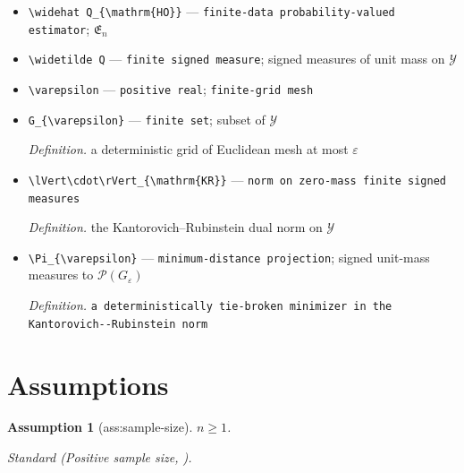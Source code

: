 \documentclass{article}
\newtheorem{assumption}{Assumption}
\begin{document}
\begin{itemize}
  \par\smallskip\noindent\emph{Definition.} \texttt{the optimized shared-\allowbreak{}sign interaction lower envelope}
  \item \texttt{\textbackslash{}\allowbreak{}widehat Q\_\allowbreak{}\{\textbackslash{}\allowbreak{}mathrm\{HO\}\allowbreak{}\}\allowbreak{}} --- \texttt{finite-\allowbreak{}data probability-\allowbreak{}valued estimator}; \(\mathfrak E_n\)
  \item \texttt{\textbackslash{}\allowbreak{}widetilde Q} --- \texttt{finite signed measure}; signed measures of unit mass on \(\mathcal Y\)
  \item \texttt{\textbackslash{}\allowbreak{}varepsilon} --- \texttt{positive real}; \texttt{finite-\allowbreak{}grid mesh}
  \item \texttt{G\_\allowbreak{}\{\textbackslash{}\allowbreak{}varepsilon\}\allowbreak{}} --- \texttt{finite set}; subset of \(\mathcal Y\)
  \par\smallskip\noindent\emph{Definition.} a deterministic grid of Euclidean mesh at most \(\varepsilon\)
  \item \texttt{\textbackslash{}\allowbreak{}lVert\textbackslash{}\allowbreak{}cdot\textbackslash{}\allowbreak{}rVert\_\allowbreak{}\{\textbackslash{}\allowbreak{}mathrm\{KR\}\allowbreak{}\}\allowbreak{}} --- \texttt{norm on zero-\allowbreak{}mass finite signed measures}
  \par\smallskip\noindent\emph{Definition.} the Kantorovich--Rubinstein dual norm on \(\mathcal Y\)
  \item \texttt{\textbackslash{}\allowbreak{}Pi\_\allowbreak{}\{\textbackslash{}\allowbreak{}varepsilon\}\allowbreak{}} --- \texttt{minimum-\allowbreak{}distance projection}; signed unit-mass measures to \(\mathcal P(G_{\varepsilon})\)
  \par\smallskip\noindent\emph{Definition.} \texttt{a deterministically tie-\allowbreak{}broken minimizer in the Kantorovich-\allowbreak{}-\allowbreak{}Rubinstein norm}
\end{itemize}

\section{Assumptions}

\begin{assumption}[ass:sample-size]\label{ass:sample-size}
\(n\ge 1\).
\par\smallskip\noindent\emph{Standard} (Positive sample size, \cite{Tsybakov2009}).
\end{assumption}
\end{document}
